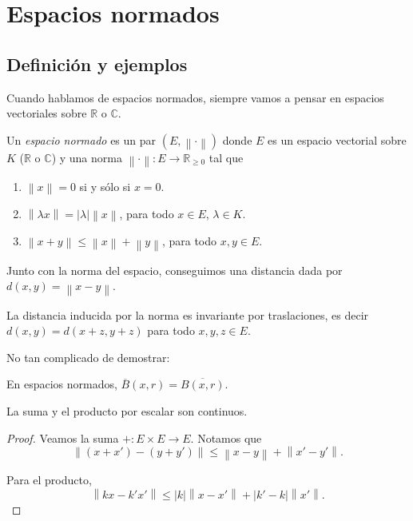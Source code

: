 \chapter{Espacios normados}

\section{Definición y ejemplos}

Cuando hablamos de espacios normados, siempre vamos a pensar en espacios vectoriales sobre $\mathbb{R}$ o $\mathbb{C}$.

\begin{definition}
	Un \emph{espacio normado} es un par $(E, \left\lVert \cdot \right\rVert)$ donde $E$ es un espacio vectorial sobre $K$ ($\mathbb{R}$ o $\mathbb{C}$) y una norma $\left\lVert \cdot \right\rVert : E \to \mathbb{R}_{\ge 0}$ tal que
	\begin{enumerate}
		\item $\left\lVert x \right\rVert = 0$ si y sólo si $x = 0$.
		\item $\left\lVert \lambda x \right\rVert = \left\lvert \lambda \right\rvert \left\lVert x \right\rVert$, para todo $x \in E$, $\lambda \in K$.
		\item $\left\lVert x + y \right\rVert \leq \left\lVert x \right\rVert + \left\lVert y \right\rVert$, para todo $x, y \in E$.
	\end{enumerate}
\end{definition}

Junto con la norma del espacio, conseguimos una distancia dada por $d(x, y) = \left\lVert x - y \right\rVert$.

\begin{remark}
	La distancia inducida por la norma es invariante por traslaciones, es decir $d(x, y) = d(x + z, y + z)$ para todo $x, y, z \in E$.
\end{remark}

No tan complicado de demostrar:

\begin{remark}
	En espacios normados, $\overline{B}(x, r) = \overline{B(x, r)}$.
\end{remark}

\begin{proposition}
	La suma y el producto por escalar son continuos.
\end{proposition}

\begin{proof}
	Veamos la suma $+ : E \times E \to E$. Notamos que
	\begin{equation*}
		\left\lVert (x + x') - (y + y')\right\rVert \leq \left\lVert x - y \right\rVert + \left\lVert x' - y' \right\rVert.
	\end{equation*}

	Para el producto,
	\begin{equation*}
		\left\lVert kx - k' x' \right\rVert \leq \left\lvert k \right\rvert \left\lVert x - x' \right\rVert + \left\lvert k' - k \right\rvert \left\lVert x' \right\rVert.
	\end{equation*}
\end{proof}

